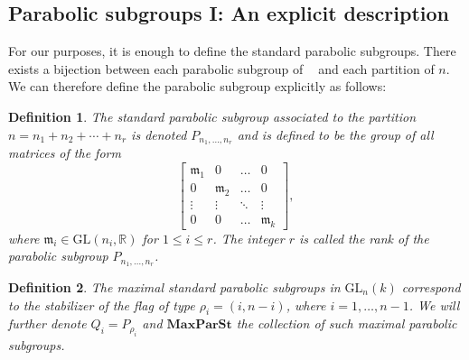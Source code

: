 \documentclass[12pt]{article} %
\newtheorem{definition}{Definition}[section]
\DeclareMathOperator{\SLn}{\text{SL}_n(\mathbb{R})}
\begin{document}
\subsection{Parabolic subgroups I: An explicit description}
For our purposes, it is enough to define the standard parabolic subgroups.  There exists a bijection between each parabolic subgroup of $\SLn$
and each partition of $n$. We can therefore define the parabolic subgroup explicitly as follows:
\begin{definition}
    The standard parabolic subgroup associated to the partition $n = n_1 + n_2 + \cdots + n_r$ is denoted $P_{n_1,\ldots,n_r}$ and is defined to be the group of all matrices of the form
    \[
        \begin{bmatrix}
            \mathfrak{m}_1 & 0              & \ldots & 0              \\
            0              & \mathfrak{m}_2 & \ldots & 0              \\
            \vdots         & \vdots         & \ddots & \vdots         \\
            0              & 0              & \ldots & \mathfrak{m}_k
        \end{bmatrix} ,
    \]
    where $\mathfrak{m}_{i} \in \mathrm{GL}(n_i, \mathbb{R})$ for $1 \leq i \leq r$. The integer $r$ is called the rank of the parabolic subgroup $P_{n_1,\ldots,n_r}$.
\end{definition}

\begin{definition}
    The maximal standard parabolic subgroups in $\text{GL}_n(k)$ correspond to the
    stabilizer of the flag of type $\rho_i =(i,n-i)$, where $i = 1,\ldots,n-1$. We will
    further denote $Q_i = P_{\rho_i}$ and $\textbf{MaxParSt}$ the collection of such maximal parabolic subgroups.
\end{definition}
\end{document}

